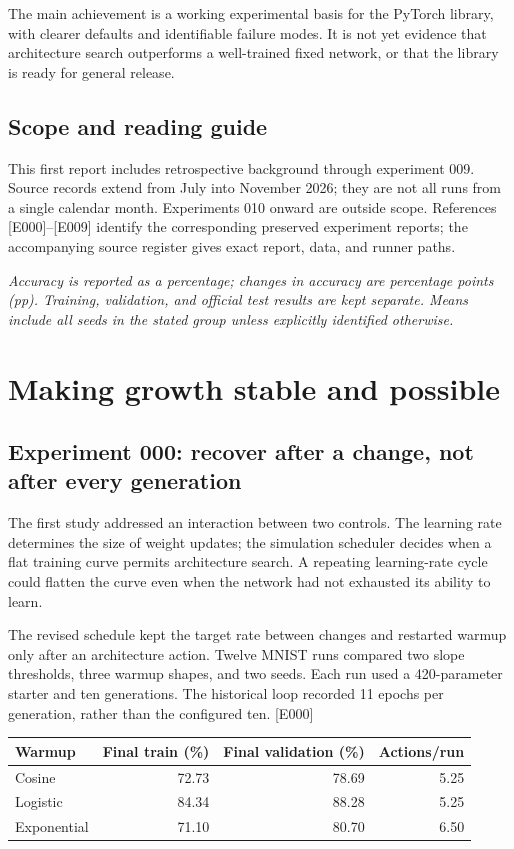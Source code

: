 \documentclass[11pt,a4paper]{article}
\newcommand{\ev}[1]{\textcolor{ink}{\small[#1]}}
\newcommand{\note}[1]{{\small\textit{#1}\par}}
\begin{document}
The main achievement is a working experimental basis for the PyTorch library, with clearer defaults and identifiable failure modes. It is not yet evidence that architecture search outperforms a well-trained fixed network, or that the library is ready for general release.

\subsection{Scope and reading guide}
This first report includes retrospective background through experiment 009. Source records extend from July into November 2026; they are not all runs from a single calendar month. Experiments 010 onward are outside scope. References \ev{E000}--\ev{E009} identify the corresponding preserved experiment reports; the accompanying source register gives exact report, data, and runner paths.

\note{Accuracy is reported as a percentage; changes in accuracy are percentage points (pp). Training, validation, and official test results are kept separate. Means include all seeds in the stated group unless explicitly identified otherwise.}

\newpage
\section{Making growth stable and possible}
\subsection{Experiment 000: recover after a change, not after every generation}
The first study addressed an interaction between two controls. The learning rate determines the size of weight updates; the simulation scheduler decides when a flat training curve permits architecture search. A repeating learning-rate cycle could flatten the curve even when the network had not exhausted its ability to learn.

The revised schedule kept the target rate between changes and restarted warmup only after an architecture action. Twelve MNIST runs compared two slope thresholds, three warmup shapes, and two seeds. Each run used a 420-parameter starter and ten generations. The historical loop recorded 11 epochs per generation, rather than the configured ten. \ev{E000}

\begin{center}
\begin{tabular}{lrrr}\toprule
Warmup & Final train (\%) & Final validation (\%) & Actions/run\\\midrule
Cosine &72.73&78.69&5.25\\
Logistic &84.34&88.28&5.25\\
Exponential &71.10&80.70&6.50\\\bottomrule
\end{tabular}
\end{center}
\end{document}
